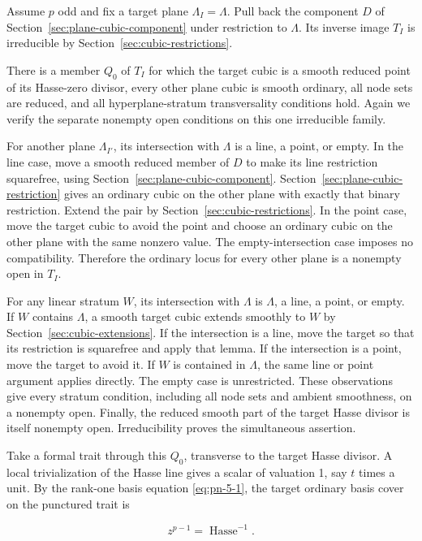 \documentclass[11pt]{article}
\begin{document}
Assume \(p\) odd and fix a target plane \(\Lambda_I=\Lambda\). Pull back the component \(D\) of Section~\ref{sec:plane-cubic-component} under restriction to \(\Lambda\). Its inverse image \(T_I\) is irreducible by Section~\ref{sec:cubic-restrictions}.

There is a member \(Q_0\) of \(T_I\) for which the target cubic is a smooth reduced point of its Hasse-zero divisor, every other plane cubic is smooth ordinary, all node sets are reduced, and all hyperplane-stratum transversality conditions hold. Again we verify the separate nonempty open conditions on this one irreducible family.

For another plane \(\Lambda_{I'}\), its intersection with \(\Lambda\) is a line, a point, or empty. In the line case, move a smooth reduced member of \(D\) to make its line restriction squarefree, using Section~\ref{sec:plane-cubic-component}. Section~\ref{sec:plane-cubic-restriction} gives an ordinary cubic on the other plane with exactly that binary restriction. Extend the pair by Section~\ref{sec:cubic-restrictions}. In the point case, move the target cubic to avoid the point and choose an ordinary cubic on the other plane with the same nonzero value. The empty-intersection case imposes no compatibility. Therefore the ordinary locus for every other plane is a nonempty open in \(T_I\).

For any linear stratum \(W\), its intersection with \(\Lambda\) is \(\Lambda\), a line, a point, or empty. If \(W\) contains \(\Lambda\), a smooth target cubic extends smoothly to \(W\) by Section~\ref{sec:cubic-extensions}. If the intersection is a line, move the target so that its restriction is squarefree and apply that lemma. If the intersection is a point, move the target to avoid it. If \(W\) is contained in \(\Lambda\), the same line or point argument applies directly. The empty case is unrestricted. These observations give every stratum condition, including all node sets and ambient smoothness, on a nonempty open. Finally, the reduced smooth part of the target Hasse divisor is itself nonempty open. Irreducibility proves the simultaneous assertion.

Take a formal trait through this \(Q_0\), transverse to the target Hasse divisor. A local trivialization of the Hasse line gives a scalar of valuation 1, say \(t\) times a unit. By the rank-one basis equation \eqref{eq:pn-5-1}, the target ordinary basis cover on the punctured trait is

\begin{equation}
z^{p-1}=\operatorname{Hasse}^{-1}.
\label{eq:cubic-4-2}
\end{equation}
\end{document}
